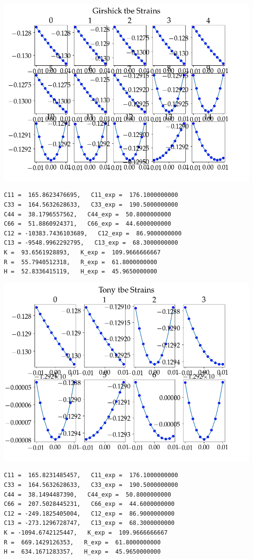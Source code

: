 \documentclass[11pt]{article}
\begin{document}
\begin{enumerate}
\begin{enumerate}
\begin{enumerate}
\begin{enumerate}
\begin{center}
\includegraphics[width=.9\linewidth]{Images/girshick_tbe_strains_2018_12_22.png}
\end{center}
\begin{verbatim}
C11 =  165.8623476695,   C11_exp =  176.1000000000
C33 =  164.5632628633,   C33_exp =  190.5000000000
C44 =  38.1796557562,   C44_exp =  50.8000000000
C66 =  51.8860924371,   C66_exp =  44.6000000000
C12 = -10383.7436103689,   C12_exp =  86.9000000000
C13 = -9548.9962292795,   C13_exp =  68.3000000000
K =  93.6561928893,   K_exp =  109.9666666667
R =  55.7940512318,   R_exp =  61.8000000000
H =  52.8336415119,   H_exp =  45.9650000000

\end{verbatim}

\begin{center}
\includegraphics[width=.9\linewidth]{Images/tony_tbe_strains_2018_12_22.png}
\end{center}
\begin{verbatim}
C11 =  165.8231485457,   C11_exp =  176.1000000000
C33 =  164.5632628633,   C33_exp =  190.5000000000
C44 =  38.1494487390,   C44_exp =  50.8000000000
C66 =  207.5028445231,   C66_exp =  44.6000000000
C12 = -249.1825405004,   C12_exp =  86.9000000000
C13 = -273.1296728747,   C13_exp =  68.3000000000
K = -1094.6742125447,   K_exp =  109.9666666667
R =  669.1429126353,   R_exp =  61.8000000000
H =  634.1671283357,   H_exp =  45.9650000000 


\end{verbatim}
\end{enumerate}
\end{enumerate}
\end{enumerate}
\end{enumerate}
\end{document}
